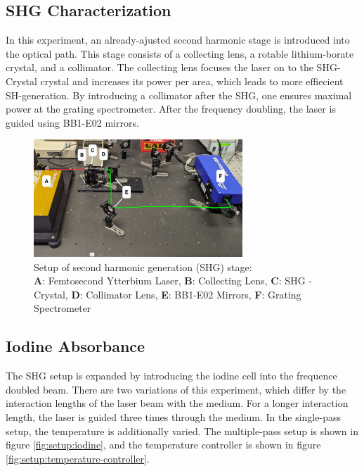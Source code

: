 \newpage
\subsection{SHG Characterization}
In this experiment, an already-ajusted second harmonic stage is introduced into the optical path.
This stage consists of a collecting lens, a rotable lithium-borate crystal, and a collimator.
The collecting lens focuses the laser on to the SHG-Crystal crystal and increases its power per area, which leads to more effiecient SH-generation.
By introducing a collimator after the SHG, one ensures maximal power at the grating spectrometer.
After the frequency doubling, the laser is guided using BB1-E02 mirrors.
\begin{figure}[H]
    \centering
    \captionsetup{margin=3cm}
    \includegraphics[width=0.7\textwidth]{graphics/shg-setup1.jpg}
    \caption{
        Setup of second harmonic generation (SHG) stage: \\
        \textbf{A}: Femtosecond Ytterbium Laser,
        \textbf{B}: Collecting Lens, 
        \textbf{C}: SHG - Crystal,
        \textbf{D}: Collimator Lens,
        \textbf{E}: BB1-E02 Mirrors,
        \textbf{F}: Grating Spectrometer
    }
    \label{fig:setup:shg}
\end{figure}
\subsection{Iodine Absorbance}
The SHG setup is expanded by introducing the iodine cell into the frequence doubled beam.
There are two variations of this experiment, which differ by the interaction lengths of the laser beam with the medium.
For a longer interaction length, the laser is guided three times through the medium.
In the single-pass setup, the temperature is additionally varied.
The multiple-pass setup is shown in figure \ref{fig:setup:iodine}, and the temperature controller is shown in figure \ref{fig:setup:temperature-controller}.


